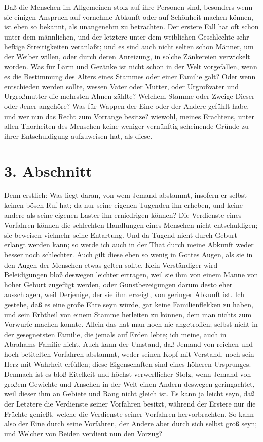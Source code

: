 Daß die Menschen im Allgemeinen stolz auf ihre Personen sind, besonders wenn sie
einigen Anspruch auf vornehme Abkunft oder auf Schönheit machen können, ist eben
so bekannt, als unangenehm zu betrachten. Der erstere Fall hat oft schon unter
dem männlichen, und der letztere unter dem weiblichen Geschlechte sehr heftige
Streitigkeiten veranlaßt; und es sind auch nicht selten schon Männer, um der
Weiber willen, oder durch deren Anreizung, in solche Zänkereien verwickelt
worden. Was für Lärm und Gezänke ist nicht schon in der Welt vorgefallen, wenn
es die Bestimmung des Alters eines Stammes oder einer Familie galt? Oder wenn
entschieden werden sollte, wessen Vater oder Mutter, oder Urgroßvater und
Urgroßmutter die mehrsten Ahnen zählte? Welchem Stamme oder Zweige Dieser oder
Jener angehöre? Was für Wappen der Eine oder der Andere gefühlt habe, und wer
nun das Recht zum Vorrange besitze? wiewohl, meines Erachtens, unter allen
Thorheiten des Menschen keine weniger vernünftig scheinende Gründe zu ihrer
Entschuldigung aufzuweisen hat, als diese.

\section{3. Abschnitt} \label{kap11_ab3}

Denn erstlich: Was liegt daran, von wem Jemand abstammt, insofern er selbst
keinen bösen Ruf hat; da nur seine eigenen Tugenden ihn erheben, und keine
andere als seine eigenen Laster ihn erniedrigen können? Die Verdienste eines
Vorfahren können die schlechten Handlungen eines Menschen nicht entschuldigen;
sie beweisen vielmehr seine Entartung. Und da Tugend nicht durch Geburt erlangt
werden kann; so werde ich auch in der That durch meine Abkunft weder besser noch
schlechter. Auch gilt diese eben so wenig in Gottes Augen, als sie in den Augen
der Menschen etwas gelten sollte. Kein Verständiger wird Beleidigungen bloß
deswegen leichter ertragen, weil sie ihm von einem Manne von hoher Geburt
zugefügt werden, oder Gunstbezeigungen darum desto eher ausschlagen, weil
Derjenige, der sie ihm erzeigt, von geringer Abkunft ist. Ich gestehe, daß es
eine große Ehre seyn würde, gar keine Familienflekken zu haben, und sein
Erbtheil von einem Stamme herleiten zu können, dem man nichts zum Vorwurfe
machen konnte. Allein das hat man noch nie angetroffen; selbst nicht in der
gesegnetsten Familie, die jemals auf Erden lebte; ich meine, auch in Abrahams
Familie nicht. Auch kann der Umstand, daß Jemand von reichen und hoch betitelten
Vorfahren abstammt, weder seinen Kopf mit Verstand, noch sein Herz mit Wahrheit
erfüllen; diese Eigenschaften sind eines höheren Ursprunges. Demnach ist es bloß
Eitelkeit und höchst verwerflicher Stolz, wenn Jemand von großem Gewichte und
Ansehen in der Welt einen Andern deswegen geringachtet, weil dieser ihm an
Gebiete und Rang nicht gleich ist. Es kann ja leicht seyn, daß der Letztere die
Verdienste seiner Vorfahren besitzt, während der Erstere nur die Früchte
genießt, welche die Verdienste seiner Vorfahren hervorbrachten. So kann also der
Eine durch seine Vorfahren, der Andere aber durch sich selbst groß seyn; und
Welcher von Beiden verdient nun den Vorzug?

